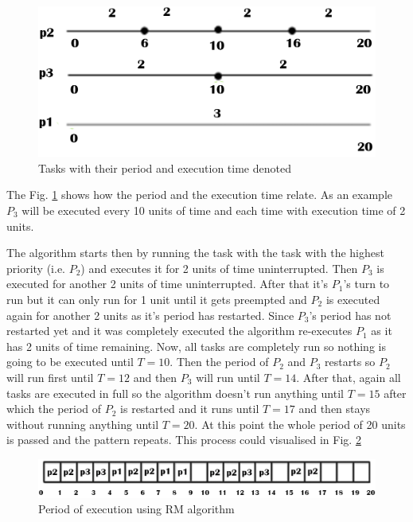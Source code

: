 \documentclass[conference]{IEEEtran}
\begin{document}
\begin{figure}[h]
    \centering
    \includegraphics[scale=0.4]{RM overview.png}
    \caption{Tasks with their period and execution time denoted}
    \label{fig:RMoverview}
\end{figure}
The Fig. \ref{fig:RMoverview} shows how the period and the execution time relate. As an example $P_3$ will be executed every 10 units of time and each time with execution time of 2 units.

The algorithm starts then by running the task with the task with the highest priority (i.e. $P_2$) and executes it for 2 units of time uninterrupted. Then $P_3$ is executed for another 2 units of time uninterrupted. After that it's $P_1$'s turn to run but it can only run for 1 unit until it gets preempted and $P_2$ is executed again for another 2 units as it's period has restarted. Since $P_3$'s period has not restarted yet and it was completely executed the algorithm re-executes $P_1$ as it has 2 units of time remaining. Now, all tasks are completely run so nothing is going to be executed until $T=10$. Then the period of $P_2$ and $P_3$ restarts so $P_2$ will run first until $T=12$ and then $P_3$ will run until $T=14$. After that, again all tasks are executed in full so the algorithm doesn't run anything until $T=15$ after which the period of $P_2$ is restarted and it runs until $T=17$ and then stays without running anything until $T=20$. At this point the whole period of 20 units is passed and the pattern repeats. This process could visualised in Fig. \ref{fig:rmTimetable}
\begin{figure}
    \centering
    \includegraphics[scale=0.3]{rmtimetable.png}
    \caption{Period of execution using RM algorithm}
    \label{fig:rmTimetable}
\end{figure}
\end{document}
